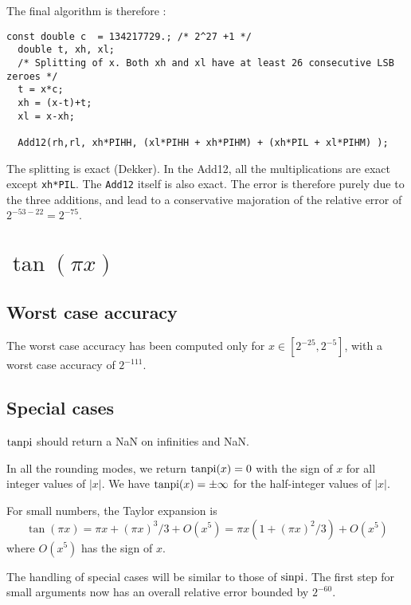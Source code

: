 The final algorithm is therefore :
\begin{lstlisting}[caption={Multiplication by $\pi$ \label{lst:trigpi:pix}},firstnumber=1]
  const double c  = 134217729.; /* 2^27 +1 */
  double t, xh, xl;
  /* Splitting of x. Both xh and xl have at least 26 consecutive LSB zeroes */
  t = x*c;
  xh = (x-t)+t;
  xl = x-xh;

  Add12(rh,rl, xh*PIHH, (xl*PIHH + xh*PIHM) + (xh*PIL + xl*PIHM) );
\end{lstlisting}

The splitting is exact (Dekker). In the Add12, all the multiplications
are exact except \texttt{xh*PIL}. The \texttt{Add12} itself is also
exact. The error is therefore purely due to the three additions, and
lead to a conservative majoration of the relative error of $2^{-53-22}
= 2^{-75}$.



\section{$\tan(\pi x)$}

\subsection{Worst case accuracy}

The worst case accuracy has been computed only for $x \in [2^{-25},
2^{-5}]$, with a worst case accuracy of $2^{-111}$.

\subsection{Special cases}


$\operatorname{tanpi}$ should return a NaN on infinities and NaN.

In all the rounding modes, we return $\operatorname{tanpi}(x)=0$ with the sign of $x$ for all
integer values of $|x|$. We have $\operatorname{tanpi}(x)=\pm \infty$ for  the half-integer
values of $|x|$.

For small numbers, the Taylor expansion is
\begin{equation}
  \tan(\pi x) = \pi x + (\pi x)^3/3 + O(x^5)
  = \pi x(1+(\pi x)^2/3) + O(x^5)\label{eq:tanpiTaylor}
\end{equation}
where $O(x^5)$ has the sign of $x$.

The handling of special cases will be similar to those of $\operatorname{sinpi}$. The
first step for small arguments now has an overall relative error
bounded by $2^{-60}$.


